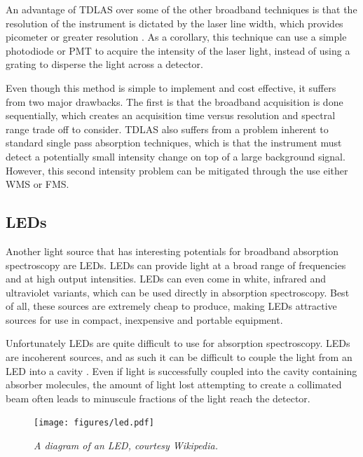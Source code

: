 An advantage of \ac{TDLAS} over some of the other broadband techniques is
that the resolution of the instrument is dictated by the laser line width,
which provides picometer or greater resolution \cite{Berden:2009wk}. As a
corollary, this technique can use a simple photodiode or \ac{PMT} to acquire
the intensity of the laser light, instead of using a grating to disperse the
light across a detector.


Even though this method is simple to implement and cost effective, it suffers
from two major drawbacks. The first is that the broadband acquisition is done
sequentially, which creates an acquisition time versus resolution and spectral
range trade off to consider. \ac{TDLAS} also suffers from a problem inherent
to standard single pass absorption techniques, which is that the instrument
must detect a potentially small intensity change on top of a large background
signal. However, this second intensity problem can be mitigated through the use
either \ac{WMS} \cite{Reid:1981vq} or \ac{FMS}.



\subsection{LEDs}\label{subsec:led}

Another light source that has interesting potentials for broadband absorption
spectroscopy are \acp{LED}. \acp{LED} can provide light at a broad range of
frequencies and at high output intensities. \acp{LED} can even come in white,
infrared and ultraviolet variants, which can be used directly in absorption
spectroscopy. Best of all, these sources are extremely cheap to produce, making
\acp{LED} attractive sources for use in compact, inexpensive and portable
equipment.

Unfortunately \acp{LED} are quite difficult to use for absorption
spectroscopy.  \acp{LED} are incoherent sources, and as such it can be
difficult to couple the light from an \ac{LED} into a
cavity \cite{Seetohul:2009du,Islam:2007ea}. Even if light is successfully
coupled into the cavity containing absorber molecules, the amount of light
lost attempting to create a collimated beam often leads to minuscule fractions
of the light reach the detector.


\begin{figure}
\begin{center}
\texttt{[image: figures/led.pdf]}
\end{center}
\emph{\footnotesize{A diagram of an \ac{LED}, courtesy Wikipedia.}}
\end{figure}

